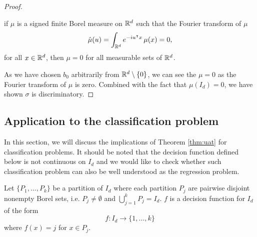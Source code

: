 \begin{proof}
    \begin{lemma}
        if $\mu$ is a signed finite Borel measure on $\mathbb{R}^d$ such that the Fourier
        transform of $\mu$
        \begin{equation}
            \hat{\mu}(u) = \int_{\mathbb{R}^d} e^{-iu{}^{\intercal} x} \,\mu(x) = 0,  
        \end{equation}
        for all $x\in\mathbb{R}^d$, then $\mu = 0$ for all measurable sets of $\mathbb{R}^d$.
    \end{lemma}

    As we have chosen $b_0$ arbitrarily from $\mathbb{R}^d \setminus \{0\}$, we can see
    the $\mu = 0$ as the Fourier transform of $\mu$ is zero. Combined with the
    fact that $\mu(I_d) = 0$, we have shown $\sigma$ is discriminatory.

\end{proof}





\subsection{Application to the classification problem}

In this section, we will discuss the implications of Theorem \ref{thm:uat} for
classification problems. It should be noted that the decision function defined
below is not continuous on $I_d$ and we would like to check whether such
classification problem can also be well understood as the regression problem.

\begin{definition}
    Let $\{P_1, \dots, P_k\}$ be a partition of $I_d$ where each partition $P_j$
    are pairwise disjoint nonempty Borel sets, i.e. $P_j \not= \emptyset$ and
    $\bigcup_{j=1}^k P_j = I_d$. $f$ is a decision function for $I_d$ of the
    form
    \begin{equation}
        f: I_d \to \{1, \dots, k\}
    \end{equation}
    where $f(x) = j$ for $x \in P_j$. 
\end{definition}

